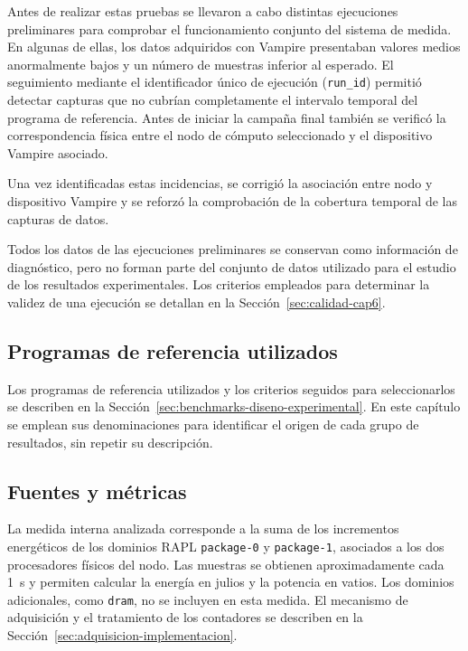 Antes de realizar estas pruebas se llevaron a cabo distintas ejecuciones preliminares para comprobar el funcionamiento conjunto del sistema de medida. En algunas de ellas, los datos adquiridos con Vampire presentaban valores medios anormalmente bajos y un número de muestras inferior al esperado. El seguimiento mediante el identificador único de ejecución (\texttt{run\_id}) permitió detectar capturas que no cubrían completamente el intervalo temporal del programa de referencia. Antes de iniciar la campaña final también se verificó la correspondencia física entre el nodo de cómputo seleccionado y el dispositivo Vampire asociado.

Una vez identificadas estas incidencias, se corrigió la asociación entre nodo y dispositivo Vampire y se reforzó la comprobación de la cobertura temporal de las capturas de datos. 

Todos los datos de las ejecuciones preliminares se conservan como información de diagnóstico, pero no forman parte del conjunto de datos utilizado para el estudio de los resultados experimentales. Los criterios empleados para determinar la validez de una ejecución se detallan en la Sección~\ref{sec:calidad-cap6}.

\subsection{Programas de referencia utilizados}

Los programas de referencia utilizados y los criterios seguidos para seleccionarlos se describen en la Sección~\ref{sec:benchmarks-diseno-experimental}. En este capítulo se emplean sus denominaciones para identificar el origen de cada grupo de resultados, sin repetir su descripción.

\subsection{Fuentes y métricas}
\label{subsec:metricas-cap6}

La medida interna analizada corresponde a la suma de los incrementos energéticos de los dominios RAPL \texttt{package-0} y \texttt{package-1}, asociados a los dos procesadores físicos del nodo. Las muestras se obtienen aproximadamente cada 1~s y permiten calcular la energía en julios y la potencia en vatios. Los dominios adicionales, como \texttt{dram}, no se incluyen en esta medida. El mecanismo de adquisición y el tratamiento de los contadores se describen en la Sección~\ref{sec:adquisicion-implementacion}.

